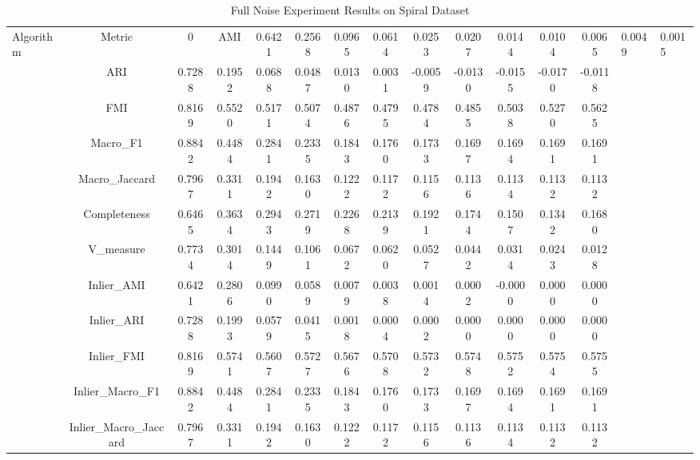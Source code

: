 \begin{table}[ht!]
\centering
\caption{Full Noise Experiment Results on Spiral Dataset}
\label{tab:noise_spiral_full}
\begin{tabular*}{\linewidth}{@{} lc c c c c c c c c c c c @{}}
\toprule
Algorithm & Metric & 0%
\midrule
{}
 & AMI  & 0.6421 & 0.2568 & 0.0965 & 0.0614 & 0.0253 & 0.0207 & 0.0144 & 0.0104 & 0.0065 & 0.0049 & 0.0015 \\

 & ARI  & 0.7288 & 0.1952 & 0.0688 & 0.0487 & 0.0130 & 0.0031 & -0.0059 & -0.0130 & -0.0155 & -0.0170 & -0.0118 \\

 & FMI  & 0.8169 & 0.5520 & 0.5171 & 0.5074 & 0.4876 & 0.4795 & 0.4784 & 0.4855 & 0.5038 & 0.5270 & 0.5625 \\

 & Macro_F1  & 0.8842 & 0.4484 & 0.2841 & 0.2335 & 0.1843 & 0.1760 & 0.1733 & 0.1697 & 0.1694 & 0.1691 & 0.1691 \\

 & Macro_Jaccard  & 0.7967 & 0.3311 & 0.1942 & 0.1630 & 0.1222 & 0.1172 & 0.1156 & 0.1136 & 0.1134 & 0.1132 & 0.1132 \\

 & Completeness  & 0.6465 & 0.3634 & 0.2943 & 0.2719 & 0.2268 & 0.2139 & 0.1921 & 0.1744 & 0.1507 & 0.1342 & 0.1680 \\

 & V_measure  & 0.7734 & 0.3014 & 0.1449 & 0.1061 & 0.0672 & 0.0620 & 0.0527 & 0.0442 & 0.0314 & 0.0243 & 0.0128 \\

 & Inlier_AMI  & 0.6421 & 0.2806 & 0.0990 & 0.0589 & 0.0079 & 0.0038 & 0.0014 & 0.0002 & -0.0000 & 0.0000 & 0.0000 \\

 & Inlier_ARI  & 0.7288 & 0.1993 & 0.0579 & 0.0415 & 0.0018 & 0.0004 & 0.0002 & 0.0000 & 0.0000 & 0.0000 & 0.0000 \\

 & Inlier_FMI  & 0.8169 & 0.5741 & 0.5607 & 0.5727 & 0.5676 & 0.5708 & 0.5732 & 0.5748 & 0.5752 & 0.5754 & 0.5755 \\

 & Inlier_Macro_F1  & 0.8842 & 0.4484 & 0.2841 & 0.2335 & 0.1843 & 0.1760 & 0.1733 & 0.1697 & 0.1694 & 0.1691 & 0.1691 \\

 & Inlier_Macro_Jaccard  & 0.7967 & 0.3311 & 0.1942 & 0.1630 & 0.1222 & 0.1172 & 0.1156 & 0.1136 & 0.1134 & 0.1132 & 0.1132 \\


\end{tabular*}
\end{table}
